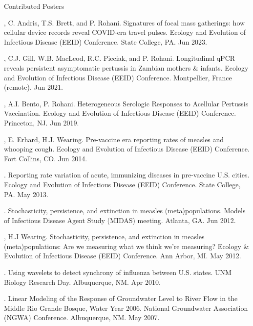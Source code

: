 \documentclass{resume} %
\begin{document}
\begin{rSection}{Contributed Posters}
\item \authSelf, C. Andris, T.S. Brett, and P. Rohani.
Signatures of focal mass gatherings: how cellular device records reveal COVID-era travel pulses. 
Ecology and Evolution of Infectious Disease (EEID) Conference. State College, PA. Jun 2023.
\item \authSelf, C.J. Gill, W.B. MacLeod, R.C. Pieciak, and P. Rohani.
Longitudinal qPCR reveals persistent asymptomatic pertussis in Zambian mothers \& infants.
Ecology and Evolution of Infectious Disease (EEID) Conference. Montpellier, France (remote). Jun 2021.
\item \authSelf, A.I. Bento, P. Rohani.  
Heterogeneous Serologic Responses to Acellular Pertussis Vaccination.
Ecology and Evolution of Infectious Disease (EEID) Conference. Princeton, NJ. Jun 2019.
\item \authSelf, E. Erhard, H.J. Wearing.  Pre-vaccine era reporting
rates of measles and whooping cough. Ecology and Evolution of Infectious Disease
(EEID) Conference. Fort Collins, CO. Jun 2014. 
\item \authSelf. Reporting rate variation of acute, immunizing diseases in
pre-vaccine U.S. cities. Ecology and Evolution of Infectious Disease
(EEID) Conference. State College, PA. May 2013. 
\item \authSelf. Stochasticity, persistence, and extinction in measles
(meta)populations. Models of Infectious Disease Agent Study
(MIDAS) meeting. Atlanta, GA. Jun 2012. 
\item \authSelf, H.J Wearing. Stochasticity, persistence, and extinction in measles
(meta)populations: Are we measuring what we think we're
measuring? Ecology \& Evolution of Infectious Disease (EEID) Conference. Ann Arbor, MI. May 2012.
\item \authSelf. Using wavelets to detect synchrony of influenza between U.S.
states. UNM Biology Research Day. Albuquerque, NM.  Apr 2010. 
\item \authSelf. Linear Modeling of the Response of Groundwater Level to River Flow
in the Middle Rio Grande Bosque, Water Year 2006. National
Groundwater Association (NGWA) Conference. Albuquerque, NM. May 2007. 
\end{rSection}
\end{document}
